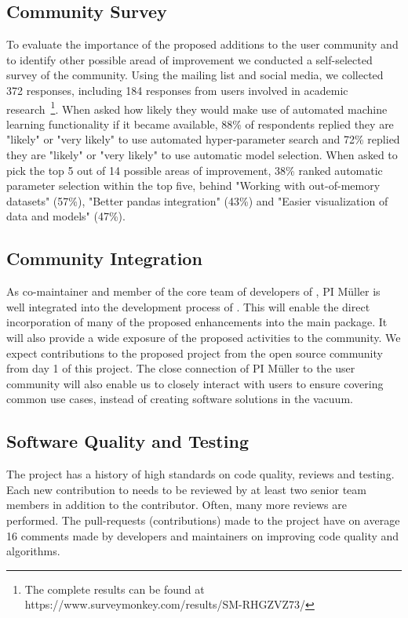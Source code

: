 \subsection{Community Survey}
To evaluate the importance of the proposed additions to the \sklearn{} user community
and to identify other possible aread of improvement we conducted a self-selected
survey of the \sklearn{} community. Using the \sklearn{} mailing list and social
media, we collected 372 responses, including 184 responses from users involved
in academic research~\footnote{The complete results can be found at https://www.surveymonkey.com/results/SM-RHGZVZ73/}.
When asked how likely they would make use of automated machine learning functionality
if it became available, 88\% of respondents replied they are "likely" or "very likely"
to use automated hyper-parameter search and 72\% replied they are "likely" or "very likely"
to use automatic model selection. When asked to pick the top 5 out of 14 possible areas of improvement,
38\% ranked automatic parameter selection within the top five, behind "Working with out-of-memory datasets" (57\%),
"Better pandas integration" (43\%) and "Easier visualization of data and models" (47\%).

\subsection{Community Integration}
As co-maintainer and member of the core team of developers of \sklearn{}, PI
M\"uller is well integrated into the development process of \sklearn{}.
This will enable the direct incorporation of many of the proposed enhancements
into the \sklearn{} main package.
It will also provide a wide exposure of the proposed activities to the
\sklearn{} community. We expect contributions to the proposed
project from the open source community from day 1 of this project.
The close connection of PI M\"uller to the \sklearn{} user community will
also enable us to closely interact with users to ensure covering common use cases,
instead of creating software solutions in the vacuum.

\subsection{Software Quality and Testing}
The \sklearn{} project has a history of high standards on code quality, reviews and testing.
Each new contribution to \sklearn{} needs to be reviewed by at least two senior team members
in addition to the contributor. Often, many more reviews are performed. The
pull-requests (contributions) made to the project have on average 16 comments
made by developers and maintainers on improving code quality and algorithms.

